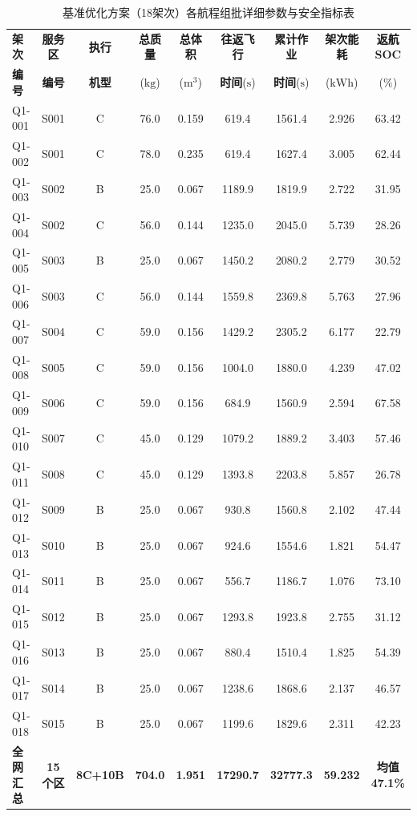 \documentclass[12pt,a4paper,UTF8]{ctexart}
\begin{document}
\begin{table}[H]
\centering
\scriptsize
\caption{基准优化方案（18架次）各航程组批详细参数与安全指标表}
\label{tab:batches_detail}
\begin{tabularx}{\textwidth}{l c c c c c c c c}
\toprule
\textbf{架次} & \textbf{服务区} & \textbf{执行} & \textbf{总质量} & \textbf{总体积} & \textbf{往返飞行} & \textbf{累计作业} & \textbf{架次能耗} & \textbf{返航SOC} \\
\textbf{编号} & \textbf{编号} & \textbf{机型} & ($\text{kg}$) & ($\text{m}^3$) & \textbf{时间}($\text{s}$) & \textbf{时间}($\text{s}$) & ($\text{kWh}$) & ($\%$) \\
\midrule
Q1-001 & S001 & C & 76.0 & 0.159 & 619.4 & 1561.4 & 2.926 & 63.42 \\
Q1-002 & S001 & C & 78.0 & 0.235 & 619.4 & 1627.4 & 3.005 & 62.44 \\
Q1-003 & S002 & B & 25.0 & 0.067 & 1189.9 & 1819.9 & 2.722 & 31.95 \\
Q1-004 & S002 & C & 56.0 & 0.144 & 1235.0 & 2045.0 & 5.739 & 28.26 \\
Q1-005 & S003 & B & 25.0 & 0.067 & 1450.2 & 2080.2 & 2.779 & 30.52 \\
Q1-006 & S003 & C & 56.0 & 0.144 & 1559.8 & 2369.8 & 5.763 & 27.96 \\
Q1-007 & S004 & C & 59.0 & 0.156 & 1429.2 & 2305.2 & 6.177 & 22.79 \\
Q1-008 & S005 & C & 59.0 & 0.156 & 1004.0 & 1880.0 & 4.239 & 47.02 \\
Q1-009 & S006 & C & 59.0 & 0.156 & 684.9 & 1560.9 & 2.594 & 67.58 \\
Q1-010 & S007 & C & 45.0 & 0.129 & 1079.2 & 1889.2 & 3.403 & 57.46 \\
Q1-011 & S008 & C & 45.0 & 0.129 & 1393.8 & 2203.8 & 5.857 & 26.78 \\
Q1-012 & S009 & B & 25.0 & 0.067 & 930.8 & 1560.8 & 2.102 & 47.44 \\
Q1-013 & S010 & B & 25.0 & 0.067 & 924.6 & 1554.6 & 1.821 & 54.47 \\
Q1-014 & S011 & B & 25.0 & 0.067 & 556.7 & 1186.7 & 1.076 & 73.10 \\
Q1-015 & S012 & B & 25.0 & 0.067 & 1293.8 & 1923.8 & 2.755 & 31.12 \\
Q1-016 & S013 & B & 25.0 & 0.067 & 880.4 & 1510.4 & 1.825 & 54.39 \\
Q1-017 & S014 & B & 25.0 & 0.067 & 1238.6 & 1868.6 & 2.137 & 46.57 \\
Q1-018 & S015 & B & 25.0 & 0.067 & 1199.6 & 1829.6 & 2.311 & 42.23 \\
\midrule
\textbf{全网汇总} & \textbf{15个区} & \textbf{8C+10B} & \textbf{704.0} & \textbf{1.951} & \textbf{17290.7} & \textbf{32777.3} & \textbf{59.232} & \textbf{均值47.1\%} \\
\bottomrule
\end{tabularx}
\end{table}
\end{document}
